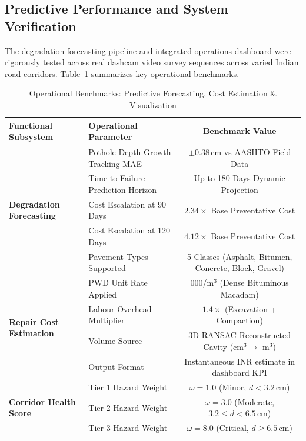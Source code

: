 \subsection{Predictive Performance and System Verification}

The degradation forecasting pipeline and integrated operations dashboard were rigorously tested across real dashcam video survey sequences across varied Indian road corridors. Table~\ref{tab:predictive_metrics} summarizes key operational benchmarks.

\begin{table}[h!]
\centering
\small
\caption{Operational Benchmarks: Predictive Forecasting, Cost Estimation \& Visualization}
\label{tab:predictive_metrics}
\begin{tabular}{llc}
\hline
\textbf{Functional Subsystem} & \textbf{Operational Parameter} & \textbf{Benchmark Value} \\ \hline
\multirow{5}{*}{\textbf{Degradation Forecasting}} 
& Pothole Depth Growth Tracking MAE & $\pm 0.38\,\text{cm}$ vs AASHTO Field Data \\
& Time-to-Failure Prediction Horizon & Up to 180 Days Dynamic Projection \\
& Cost Escalation at 90 Days & $2.34\times$ Base Preventative Cost \\
& Cost Escalation at 120 Days & $4.12\times$ Base Preventative Cost \\
& Pavement Types Supported & 5 Classes (Asphalt, Bitumen, Concrete, Block, Gravel) \\ \hline
\multirow{4}{*}{\textbf{Repair Cost Estimation}} 
& PWD Unit Rate Applied & \rupee8{,}000/m$^3$ (Dense Bituminous Macadam) \\
& Labour Overhead Multiplier & $1.4\times$ (Excavation + Compaction) \\
& Volume Source & 3D RANSAC Reconstructed Cavity (cm$^3 \to$ m$^3$) \\
& Output Format & Instantaneous INR estimate in dashboard KPI \\ \hline
\multirow{4}{*}{\textbf{Corridor Health Score}} 
& Tier 1 Hazard Weight & $\omega = 1.0$ (Minor, $d < 3.2\,\text{cm}$) \\
& Tier 2 Hazard Weight & $\omega = 3.0$ (Moderate, $3.2 \le d < 6.5\,\text{cm}$) \\
& Tier 3 Hazard Weight & $\omega = 8.0$ (Critical, $d \ge 6.5\,\text{cm}$) \\

\end{tabular}
\end{table}
